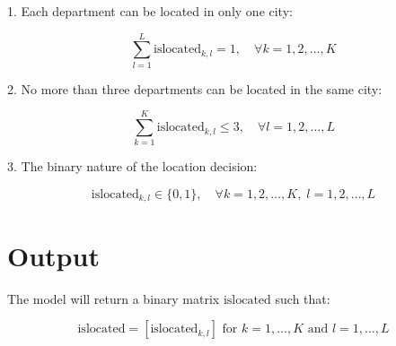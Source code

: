 \documentclass{article}
\begin{document}
1. Each department can be located in only one city:

\[
\sum_{l=1}^{L} \text{islocated}_{k, l} = 1, \quad \forall k = 1, 2, \ldots, K
\]

2. No more than three departments can be located in the same city:

\[
\sum_{k=1}^{K} \text{islocated}_{k, l} \leq 3, \quad \forall l = 1, 2, \ldots, L
\]

3. The binary nature of the location decision:

\[
\text{islocated}_{k, l} \in \{0, 1\}, \quad \forall k = 1, 2, \ldots, K, \; l = 1, 2, \ldots, L
\]

\section*{Output}

The model will return a binary matrix \( \text{islocated} \) such that:

\[
\text{islocated} = \left[ \text{islocated}_{k, l} \right] \text{ for } k = 1, \ldots, K \text{ and } l = 1, \ldots, L
\]
\end{document}
